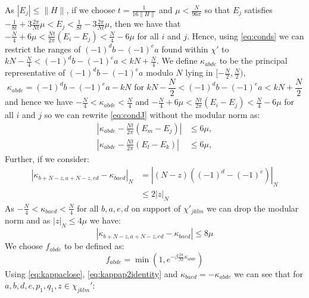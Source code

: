 \documentclass[aps,floatfix,10pt,amssymb,amsfont,amsmath,superscriptaddress,float,nofootinbib,longbibliography,nobalancelastpage,twocolumn]{revtex4-2}
\begin{document}
As $|E_j| \leq \|H\|$, if we choose $t = \frac{1}{16\|H\|}$ and $\mu < \frac{N}{96\pi}$ so that $E_j$ satisfies $-\frac{1}{8t} + 3\frac{2\pi}{Nt}\mu < E_j < \frac{1}{8t} - 3\frac{2\pi}{Nt}\mu$, then we have that $-\frac{N}{4}+6\mu < \frac{Nt}{2\pi}(E_i -E_j) < \frac{N}{4}-6\mu$ for all $i$ and $j$. Hence, using \eqref{eq:conds} we can restrict the ranges of $(-1)^db-(-1)^ea$ found within $\chi'$ to $kN - \frac{N}{4}< (-1)^db-(-1)^ea < kN + \frac{N}{4}$.
We define $\kappa_{abde}$ to be the principal representative of $(-1)^db-(-1)^ea$ modulo $N$ lying in $[-\frac{N}{2},\frac{N}{2})$, 
\begin{equation}
    \kappa_{abde} = (-1)^db-(-1)^ea-kN \text{ for } kN - \frac{N}{2}< (-1)^db-(-1)^ea < kN + \frac{N}{2}
    \label{eq:kappadef}
\end{equation}
and hence we have $-\frac{N}{4}<\kappa_{abde} < \frac{N}{4}$ and $-\frac{N}{4}+6\mu < \frac{Nt}{2\pi}(E_i -E_j) < \frac{N}{4}-6\mu$ for all $i$ and $j$ so we can rewrite \eqref{eq:condJ} without the modular norm as:
\begin{equation}
    \begin{aligned}
    \left|\kappa_{abde}-\frac{Nt}{2\pi}(E_m-E_j)\right|&\leq 6\mu,\\
    \left|\kappa_{abde}-\frac{Nt}{2\pi}(E_l-E_k)\right|&\leq 6\mu,
\end{aligned}
\label{eq:kappaclose}
\end{equation}
Further, if we consider:
\begin{align}
    \left|\kappa_{b+N-z,a+N-z,ed} - \kappa_{baed}\right|_{N} &= |(N-z)((-1)^d-(-1)^e)|_{N}\\
    &\leq 2|z|_{N}
\end{align}
As $-\frac{N}{4}<\kappa_{baed} < \frac{N}{4}$ for all $b,a,e,d$ on support of $\chi'_{jklm}$ we can drop the modular norm and as $|z|_{N} \leq 4\mu$ we have:
\begin{equation}
    \left|\kappa_{b+N-z,a+N-z,ed} - \kappa_{baed}\right| \leq 8\mu
    \label{eq:kappap2identity}
\end{equation}
We choose $f_{abde}$ to be defined as:
\begin{equation}
    f_{abde} = \min(1,e^{-\beta\frac{2\pi}{Nt}\kappa_{abde}})
\end{equation}
Using \eqref{eq:kappaclose}, \eqref{eq:kappap2identity} and $\kappa_{baed}
= -\kappa_{abde}$ we can see that for $a,b,d,e,p_1,q_1,z \in \chi_{jklm}'$:
\end{document}
